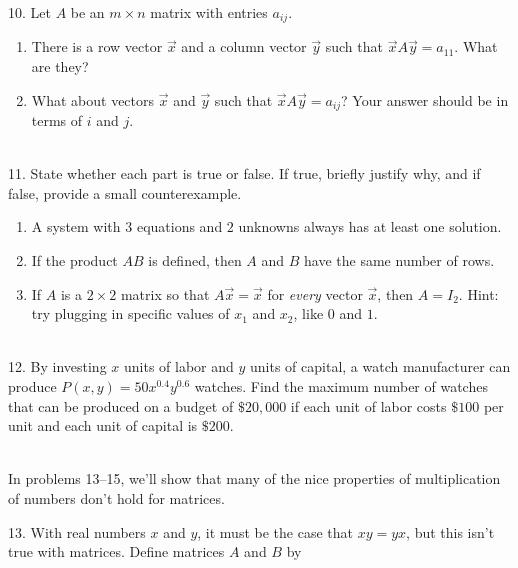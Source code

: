 \documentclass{article}
\begin{document}
10. Let $A$ be an $m \times n$ matrix with entries $a_{ij}$.

\begin{enumerate}

	\item There is a row vector $\vec{x}$ and a column vector $\vec{y}$ such that $\vec{x}A\vec{y} = a_{11}$. What are they?

	\item What about vectors $\vec{x}$ and $\vec{y}$ such that $\vec{x}A\vec{y} = a_{ij}$? Your answer should be in terms of $i$ and $j$.

\end{enumerate}

~\\

11. State whether each part is true or false. If true, briefly justify why, and if false, provide a small counterexample.

\begin{enumerate}

	\item A system with $3$ equations and $2$ unknowns always has at least one solution.

	\item If the product $AB$ is defined, then $A$ and $B$ have the same number of rows.

	\item If $A$ is a $2 \times 2$ matrix so that $A\vec{x} = \vec{x}$ for \textit{every} vector $\vec{x}$, then $A = I_2$. Hint: try plugging in specific values of $x_1$ and $x_2$, like $0$ and $1$.

\end{enumerate}

~\\

12. By investing $x$ units of labor and $y$ units of capital, a watch manufacturer can produce $P(x, y) = 50x^{0.4}y^{0.6}$ watches. Find the maximum number of watches that can be produced on a budget of $\$20,000$ if each unit of labor costs $\$100$ per unit and each unit of capital is $\$200$.

~\\

In problems 13--15, we'll show that many of the nice properties of multiplication of numbers don't hold for matrices.

13. With real numbers $x$ and $y$, it must be the case that $xy = yx$, but this isn't true with matrices. Define matrices $A$ and $B$ by
\end{document}
